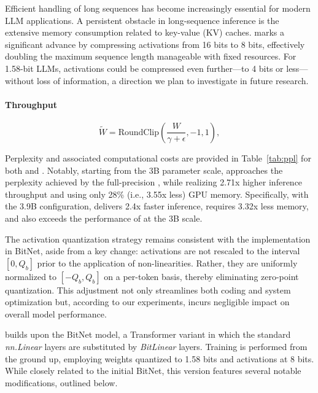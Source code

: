 Efficient handling of long sequences has become increasingly essential for modern LLM applications. A persistent obstacle in long-sequence inference is the extensive memory consumption related to key-value (KV) caches.  marks a significant advance by compressing activations from 16 bits to 8 bits, effectively doubling the maximum sequence length manageable with fixed resources. For 1.58-bit LLMs, activations could be compressed even further—to 4 bits or less—without loss of information, a direction we plan to investigate in future research.

\paragraph{Throughput}

\begin{equation}
    \widetilde{W} = \mathrm{RoundClip}(\frac{W}{\gamma + \epsilon}, -1, 1),
\end{equation}

Perplexity and associated computational costs are provided in Table~\ref{tab:ppl} for both  and . Notably, starting from the 3B parameter scale,  approaches the perplexity achieved by the full-precision , while realizing 2.71x higher inference throughput and using only 28\% (i.e., 3.55x less) GPU memory. Specifically, with the 3.9B configuration,  delivers 2.4x faster inference, requires 3.32x less memory, and also exceeds the performance of  at the 3B scale.

The activation quantization strategy remains consistent with the implementation in BitNet, aside from a key change: activations are not rescaled to the interval $[0, Q_b]$ prior to the application of non-linearities. Rather, they are uniformly normalized to $[-Q_b, Q_b]$ on a per-token basis, thereby eliminating zero-point quantization. This adjustment not only streamlines both coding and system optimization but, according to our experiments, incurs negligible impact on overall model performance.

 builds upon the BitNet model, a Transformer variant in which the standard \emph{nn.Linear} layers are substituted by \emph{BitLinear} layers. Training is performed from the ground up, employing weights quantized to 1.58 bits and activations at 8 bits. While closely related to the initial BitNet, this version features several notable modifications, outlined below.

